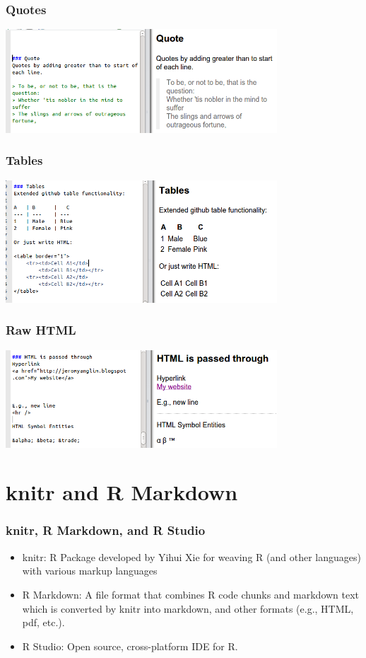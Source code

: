 \begin{frame}\frametitle{Quotes}

\includegraphics[width=4in]{figures/quote.png}

\end{frame}

\begin{frame}\frametitle{Tables}

\includegraphics[width=4in]{figures/tables.png}

\end{frame}

\begin{frame}\frametitle{Raw HTML}

\includegraphics[width=4in]{figures/html.png}

\end{frame}

\section{knitr and R Markdown}

\begin{frame}\frametitle{knitr, R Markdown, and R Studio}

\begin{itemize}
\item
  knitr: R Package developed by Yihui Xie for weaving R (and other
  languages) with various markup languages
\item
  R Markdown: A file format that combines R code chunks and markdown
  text which is converted by knitr into markdown, and other formats
  (e.g., HTML, pdf, etc.).
\item
  R Studio: Open source, cross-platform IDE for R.
\end{itemize}

\end{frame}

